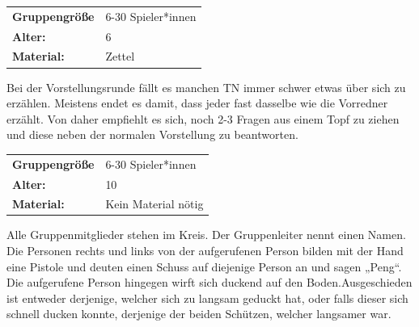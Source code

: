 \newpage
\begin{table}[H]
\begin{tabular}{>{\bfseries}lp{8cm}}
   Gruppengröße   & 6-30 Spieler*innen\\
    Alter: & 6 \\
    Material: & Zettel \\
\end{tabular}
\end{table} 
Bei der Vorstellungsrunde fällt es manchen TN immer schwer etwas über sich zu erzählen. Meistens endet es damit, dass jeder fast dasselbe wie die Vorredner erzählt. Von daher empfiehlt es sich, noch 2-3 Fragen aus einem Topf zu ziehen und diese neben der normalen Vorstellung zu beantworten. \\



\begin{table}[H]
\begin{tabular}{>{\bfseries}lp{8cm}}
   Gruppengröße   & 6-30 Spieler*innen\\
    Alter: & 10 \\
    Material: & Kein Material nötig\\
\end{tabular}
\end{table} 
Alle Gruppenmitglieder stehen im Kreis. Der Gruppenleiter nennt einen Namen. Die Personen rechts und links von der aufgerufenen Person bilden mit der Hand eine Pistole und deuten einen Schuss auf diejenige Person an und sagen „Peng“. Die aufgerufene Person hingegen wirft sich duckend auf den Boden.Ausgeschieden ist entweder derjenige, welcher sich zu langsam geduckt hat, oder falls dieser sich schnell ducken konnte, derjenige der beiden Schützen, welcher langsamer war. \\




